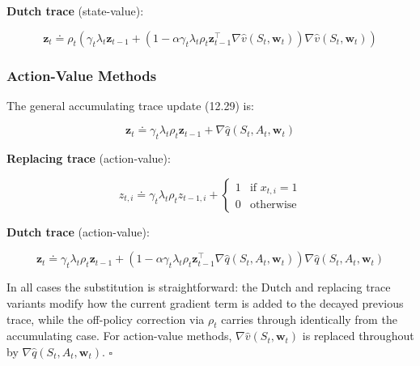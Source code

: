 \documentclass{article}
\begin{document}
\textbf{Dutch trace} (state-value):

$$\mathbf{z}_t \doteq \rho_t\left(\gamma_t\lambda_t\mathbf{z}_{t-1} + 
(1 - \alpha\gamma_t\lambda_t\rho_t\mathbf{z}_{t-1}^\top\nabla\hat{v}(S_t, \mathbf{w}_t))
\nabla\hat{v}(S_t, \mathbf{w}_t)\right)$$

\subsubsection*{Action-Value Methods}

The general accumulating trace update (12.29) is:

$$\mathbf{z}_t \doteq \gamma_t\lambda_t\rho_t\mathbf{z}_{t-1} + \nabla\hat{q}(S_t, A_t, \mathbf{w}_t)$$

\textbf{Replacing trace} (action-value):

$$z_{t,i} \doteq \gamma_t\lambda_t\rho_t z_{t-1,i} + \begin{cases} 1 & \text{if } x_{t,i} = 1 \\ 0 & \text{otherwise}\end{cases}$$

\textbf{Dutch trace} (action-value):

$$\mathbf{z}_t \doteq \gamma_t\lambda_t\rho_t\mathbf{z}_{t-1} + 
(1 - \alpha\gamma_t\lambda_t\rho_t\mathbf{z}_{t-1}^\top\nabla\hat{q}(S_t, A_t, \mathbf{w}_t))
\nabla\hat{q}(S_t, A_t, \mathbf{w}_t)$$

In all cases the substitution is straightforward: the Dutch and replacing trace variants 
modify how the current gradient term is added to the decayed previous trace, while the 
off-policy correction via $\rho_t$ carries through identically from the accumulating 
case. For action-value methods, $\nabla\hat{v}(S_t, \mathbf{w}_t)$ is replaced 
throughout by $\nabla\hat{q}(S_t, A_t, \mathbf{w}_t)$. \hfill$\square$
\\\\
\end{document}
